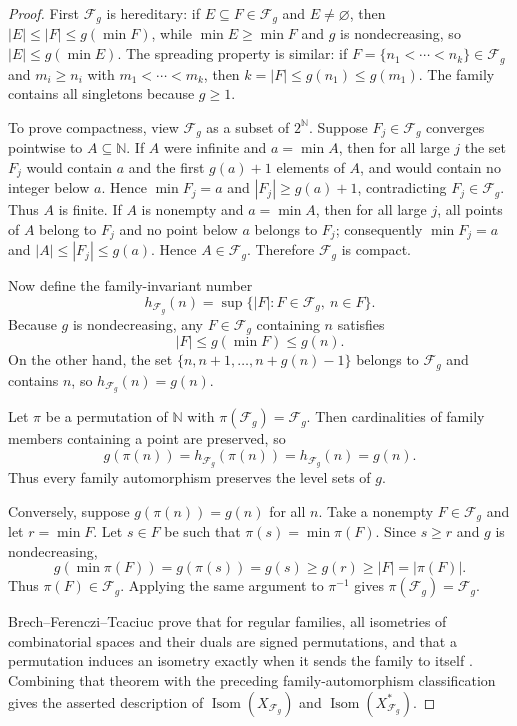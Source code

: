 \documentclass[11pt]{article}
\newcommand{\N}{\mathbb{N}}
\newcommand{\F}{\mathcal{F}}
\newcommand{\Isom}{\operatorname{Isom}}
\begin{document}
\begin{proof}
First $\F_g$ is hereditary: if $E\subseteq F\in\F_g$ and $E\neq\varnothing$,
then $|E|\leq |F|\leq g(\min F)$, while $\min E\geq \min F$ and $g$ is
nondecreasing, so $|E|\leq g(\min E)$.  The spreading property is similar:
if $F=\{n_1<\cdots<n_k\}\in\F_g$ and $m_i\geq n_i$ with
$m_1<\cdots<m_k$, then $k=|F|\leq g(n_1)\leq g(m_1)$.
The family contains all singletons because $g\geq 1$.

To prove compactness, view $\F_g$ as a subset of $2^\N$.  Suppose
$F_j\in\F_g$ converges pointwise to $A\subseteq\N$.  If $A$ were infinite and
$a=\min A$, then for all large $j$ the set $F_j$ would contain $a$ and the
first $g(a)+1$ elements of $A$, and would contain no integer below $a$.
Hence $\min F_j=a$ and $|F_j|\geq g(a)+1$, contradicting
$F_j\in\F_g$.  Thus $A$ is finite.  If $A$ is nonempty and $a=\min A$, then
for all large $j$, all points of $A$ belong to $F_j$ and no point below $a$
belongs to $F_j$; consequently $\min F_j=a$ and
$|A|\leq |F_j|\leq g(a)$.  Hence $A\in\F_g$.  Therefore $\F_g$ is compact.

Now define the family-invariant number
\[
  h_{\F_g}(n)=\sup\{|F|:F\in\F_g,\ n\in F\}.
\]
Because $g$ is nondecreasing, any $F\in\F_g$ containing $n$ satisfies
\[
  |F|\leq g(\min F)\leq g(n).
\]
On the other hand, the set $\{n,n+1,\ldots,n+g(n)-1\}$ belongs to $\F_g$ and
contains $n$, so $h_{\F_g}(n)=g(n)$.

Let $\pi$ be a permutation of $\N$ with
$\pi(\F_g)=\F_g$.  Then cardinalities of family members containing a point
are preserved, so
\[
  g(\pi(n))=h_{\F_g}(\pi(n))=h_{\F_g}(n)=g(n).
\]
Thus every family automorphism preserves the level sets of $g$.

Conversely, suppose $g(\pi(n))=g(n)$ for all $n$.  Take a nonempty
$F\in\F_g$ and let $r=\min F$.  Let $s\in F$ be such that
$\pi(s)=\min \pi(F)$.  Since $s\geq r$ and $g$ is nondecreasing,
\[
  g(\min\pi(F))=g(\pi(s))=g(s)\geq g(r)\geq |F|=|\pi(F)|.
\]
Thus $\pi(F)\in\F_g$.  Applying the same argument to $\pi^{-1}$ gives
$\pi(\F_g)=\F_g$.

Brech--Ferenczi--Tcaciuc prove that for regular families, all isometries of
combinatorial spaces and their duals are signed permutations, and that a
permutation induces an isometry exactly when it sends the family to itself
\cite[Theorem 10 and the following corollary]{BFT}.  Combining that theorem
with the preceding family-automorphism classification gives the asserted
description of $\Isom(X_{\F_g})$ and $\Isom(X_{\F_g}^*)$.
\end{proof}
\end{document}
